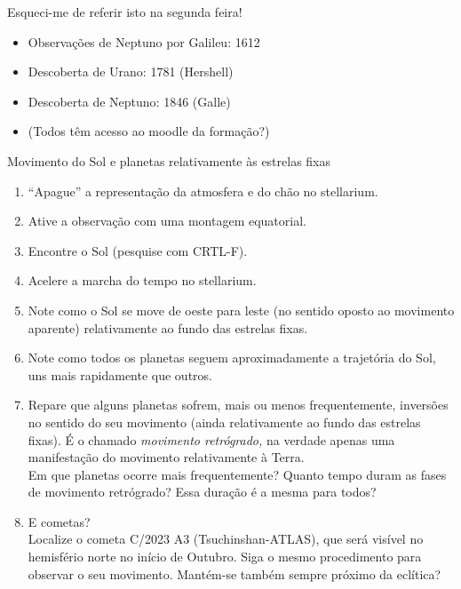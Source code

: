 \documentclass[beamer,9pt,aspectratio=169]{beamer}
\begin{document}
\begin{frame}{Esqueci-me de referir isto na segunda feira!}
\begin{itemize}
  \item Observações de Neptuno por Galileu: 1612
    \vspace{2em}
  \item Descoberta de Urano: 1781 (Hershell)
    \vspace{2em}
  \item Descoberta de Neptuno: 1846 (Galle)
    \vspace{8em}
  \item
    (Todos têm acesso ao moodle da formação?)
\end{itemize}
\end{frame}
\begin{frame}{Movimento do Sol e planetas relativamente às estrelas fixas}
  \begin{enumerate}
    \setlength{\itemsep}{0.9em}
    \item ``Apague'' a representação da atmosfera e do chão no stellarium.
    \item Ative a observação com uma montagem equatorial.
    \item Encontre o Sol (pesquise com CRTL-F).
    \item Acelere a marcha do tempo no stellarium.
    \item Note como o Sol se move de oeste para leste (no sentido oposto ao
      movimento aparente) relativamente ao fundo das estrelas fixas.
    \item Note como todos os planetas seguem aproximadamente a trajetória do Sol,
      uns mais rapidamente que outros.
    \item Repare que alguns planetas sofrem, mais ou menos frequentemente,
      inversões no sentido do seu movimento (ainda relativamente ao fundo das
      estrelas fixas). É o chamado \emph{movimento retrógrado,} na verdade
      apenas uma manifestação do movimento relativamente à Terra.\\
      {\small\textsf{%
      Em que planetas ocorre mais frequentemente? Quanto tempo duram as fases de
      movimento retrógrado? Essa duração é a mesma para todos?
      }}
    \item
      E cometas?\\ Localize o cometa C/2023 A3 (Tsuchinshan-ATLAS), que será
      visível no hemisfério norte no início de Outubro. Siga o mesmo
      procedimento para observar o seu movimento. Mantém-se também sempre
      próximo da eclítica?
  \end{enumerate}
\end{frame}
\end{document}
